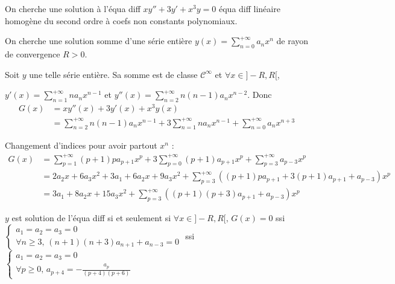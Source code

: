 \begin{exemple}
    On cherche une solution à l'équa diff $x y'' + 3 y' + x^3 y = 0$ équa diff linéaire homogène 
    du second ordre à coefs non constants polynomiaux. 

    On cherche une solution somme d'une série entière $\displaystyle y(x) = \sum_{n = 0}^{+\infty} a_n x^n$
    de rayon de convergence $R > 0$.

    Soit $y $ une telle série entière. Sa somme est de classe $\mathscr {C}^\infty$ et 
    $\displaystyle \forall x \in ]-R, R[$, 
    
    $\displaystyle y'(x) = \sum_{n = 1}^{+\infty} n a_n x^{n - 1}$ et
    $\displaystyle y''(x) = \sum_{n = 2}^{+\infty} n (n - 1) a_n x^{n - 2}$.
    Donc 
    \begin{align}
        G(x) & = xy''(x) + 3y'(x) + x^3y(x) \\
        & = \sum_{n = 2 }^{+ \infty   } n (n - 1) a_n x^{n - 1} + 3 \sum_{n = 1}^{+\infty} n a_n x^{n - 1} + \sum_{n = 0}^{+\infty} a_n x^{n + 3} 
    \end{align}

    Changement d'indices pour avoir partout $x^n$ :
    \begin{align}
        G(x) & = \sum_{p = 1}^{+\infty} (p + 1) p a_{p + 1} x^p + 3 \sum_{p = 0}^{+\infty} (p + 1) a_{p + 1} x^p + \sum_{p = 3}^{+\infty} a_{p - 3} x^p \\
        & = 2 a_2 x + 6 a_3 x^2 + 3 a_1 + 6 a_2 x + 9 a_3 x^2 + \sum_{p = 3}^{+\infty} \left( (p + 1) p a_{p + 1} + 3 (p + 1) a_{p + 1} + a_{p - 3} \right) x^p \\
        & = 3 a_1 + 8 a_2 x + 15 a_3 x^2 + \sum_{p = 3}^{+\infty} \left( (p + 1)(p + 3) a_{p + 1} + a_{p - 3} \right) x^p
    \end{align}

    $y$ est solution de l'équa diff si et seulement si $\forall x \in ]-R, R[, \, G(x) = 0$ 
    ssi $\left\{ \begin{matrix}
        a_1 = a_2 = a_3 = 0 \\
        \forall n \geqslant 3, \, (n + 1) (n + 3) a_{n + 1} + a_{n - 3} = 0
    \end{matrix}\right.$ ssi $\left\{ 
       \begin{matrix}
        a_1 = a_2 = a_3 = 0 \\
        \forall p \geqslant 0, \, a_{p + 4} = - \frac{a_p}{(p + 4)(p + 6)}
       \end{matrix} 
    \right.$


\end{exemple}
